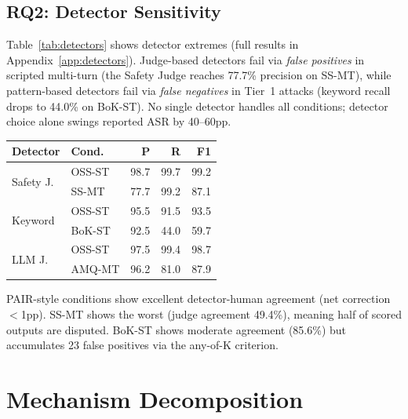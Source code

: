 \documentclass[11pt]{article}
\begin{document}
\subsection{RQ2: Detector Sensitivity}
\label{sec:rq2}

Table~\ref{tab:detectors} shows detector extremes (full results in Appendix~\ref{app:detectors}). Judge-based detectors fail via \textit{false positives} in scripted multi-turn (the Safety Judge reaches 77.7\% precision on SS-MT), while pattern-based detectors fail via \textit{false negatives} in Tier~1 attacks (keyword recall drops to 44.0\% on BoK-ST). No single detector handles all conditions; detector choice alone swings reported ASR by 40--60pp.

\vspace{0.5em}
\nolinenumbers
\noindent
\begin{minipage}{\columnwidth}
\centering
\small
{}
\label{tab:detectors}
\vspace{0.3em}
\begin{tabular}{llrrr}
\toprule
\textbf{Detector} & \textbf{Cond.} & \textbf{P} & \textbf{R} & \textbf{F1} \\
\midrule
\multirow{2}{*}{Safety J.} & OSS-ST & 98.7 & 99.7 & 99.2 \\
 & SS-MT & 77.7 & 99.2 & 87.1 \\
\midrule
\multirow{2}{*}{Keyword} & OSS-ST & 95.5 & 91.5 & 93.5 \\
 & BoK-ST & 92.5 & 44.0 & 59.7 \\
\midrule
\multirow{2}{*}{LLM J.} & OSS-ST & 97.5 & 99.4 & 98.7 \\
 & AMQ-MT & 96.2 & 81.0 & 87.9 \\
\bottomrule
\end{tabular}
\end{minipage}
\linenumbers
\vspace{0.5em}

PAIR-style conditions show excellent detector-human agreement (net correction $<$1pp). SS-MT shows the worst (judge agreement 49.4\%), meaning half of scored outputs are disputed. BoK-ST shows moderate agreement (85.6\%) but accumulates 23 false positives via the any-of-K criterion.

\section{Mechanism Decomposition}
\label{sec:mechanism}
\end{document}
